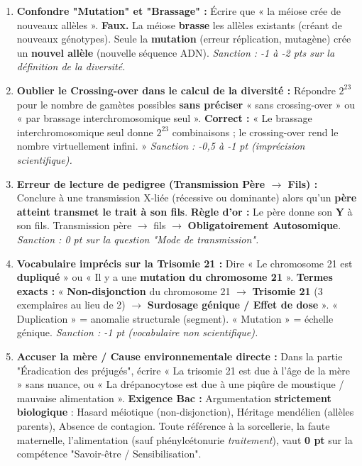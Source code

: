 \documentclass[11pt]{article}
\begin{document}
\begin{attention}
    \begin{enumerate}
        \item \textbf{Confondre "Mutation" et "Brassage" :} Écrire que « la méiose crée de nouveaux allèles ». \textbf{Faux.} La méiose \textbf{brasse} les allèles existants (créant de nouveaux génotypes). Seule la \textbf{mutation} (erreur réplication, mutagène) crée un \textbf{nouvel allèle} (nouvelle séquence ADN). \textit{Sanction : -1 à -2 pts sur la définition de la diversité.}
        \item \textbf{Oublier le Crossing-over dans le calcul de la diversité :} Répondre $2^{23}$ pour le nombre de gamètes possibles \textbf{sans préciser} « sans crossing-over » ou « par brassage interchromosomique seul ». \textbf{Correct :} « Le brassage interchromosomique seul donne $2^{23}$ combinaisons ; le crossing-over rend le nombre virtuellement infini. » \textit{Sanction : -0,5 à -1 pt (imprécision scientifique).}
        \item \textbf{Erreur de lecture de pedigree (Transmission Père $\rightarrow$ Fils) :} Conclure à une transmission X-liée (récessive ou dominante) alors qu'un \textbf{père atteint transmet le trait à son fils}. \textbf{Règle d'or :} Le père donne son \textbf{Y} à son fils. Transmission père $\rightarrow$ fils $\rightarrow$ \textbf{Obligatoirement Autosomique}. \textit{Sanction : 0 pt sur la question "Mode de transmission".}
        \item \textbf{Vocabulaire imprécis sur la Trisomie 21 :} Dire « Le chromosome 21 est \textbf{dupliqué} » ou « Il y a une \textbf{mutation du chromosome 21} ». \textbf{Termes exacts :} « \textbf{Non-disjonction} du chromosome 21 $\rightarrow$ \textbf{Trisomie 21} (3 exemplaires au lieu de 2) $\rightarrow$ \textbf{Surdosage génique / Effet de dose} ». « Duplication » = anomalie structurale (segment). « Mutation » = échelle génique. \textit{Sanction : -1 pt (vocabulaire non scientifique).}
        \item \textbf{Accuser la mère / Cause environnementale directe :} Dans la partie "Éradication des préjugés", écrire « La trisomie 21 est due à l'âge de la mère » sans nuance, ou « La drépanocytose est due à une piqûre de moustique / mauvaise alimentation ». \textbf{Exigence Bac :} Argumentation \textbf{strictement biologique} : Hasard méiotique (non-disjonction), Héritage mendélien (allèles parents), Absence de contagion. Toute référence à la sorcellerie, la faute maternelle, l'alimentation (sauf phénylcétonurie \emph{traitement}), vaut \textbf{0 pt} sur la compétence "Savoir-être / Sensibilisation".
    \end{enumerate}
\end{attention}
\end{document}
